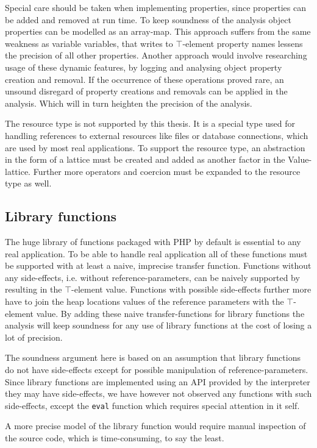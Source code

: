 Special care should be taken when implementing properties, since properties can be added and removed at run time. To keep soundness of the analysis object properties can be modelled as an array-map. This approach suffers from the same weakness as variable variables, that writes to $\top$-element property names lessens the precision of all other properties. Another approach would involve researching usage of these dynamic features, by  logging and analysing object property creation and removal. If the occurrence of these operations proved rare, an unsound disregard of property creations and removals can be applied in the analysis. Which will in turn heighten the precision of the analysis.

The resource type is not supported by this thesis. It is a special type used for handling references to external resources like files or database connections, which are used by most real applications. To support the resource type, an abstraction in the form of a lattice must be created and added as another factor in the Value-lattice. Further more operators and coercion must be expanded to the resource type as well.

\subsection{Library functions}
The huge library of functions packaged with PHP by default is essential to any real application. To be able to handle real application all of these functions must be supported with at least a naive, imprecise transfer function. Functions without any side-effects, i.e. without reference-parameters, can be naively supported by resulting in the $\top$-element value. Functions with possible side-effects further more have to join the heap locations values of the reference parameters with the $\top$-element value. By adding these naive transfer-functions for library functions the analysis will keep soundness for any use of library functions at the cost of losing a lot of precision. 

The soundness argument here is based on an assumption that library functions do not have side-effects except for possible manipulation of reference-parameters. Since library functions are implemented using an API provided by the interpreter they may have side-effects, we have however not observed any functions with such side-effects, except the \texttt{eval} function which requires special attention in it self. 

A more precise model of the library function would require manual inspection of the source code, which is  time-consuming, to say the least.

